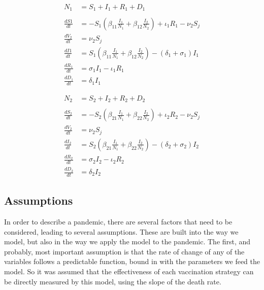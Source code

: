 \documentclass{article}
\begin{document}
\noindent\begin{minipage}{.5\linewidth}
\begin{align*}
    N_1 &= S_1 + I_1 + R_1 + D_1 \\ \\
    \frac{dS1}{dt} &= - S_1 \left(\beta_{11} \frac{I_1}{N_1} + \beta_{12} \frac{I_2}{N_2} \right) + \iota_1 R_1 - \nu_2S_j \\
    \frac{dV_2}{dt} &= \nu_2S_j\\
    \frac{dI1}{dt} &= S_1 \left(\beta_{11} \frac{I_1}{N_1} + \beta_{12} \frac{I_2}{N_2} \right) - (\delta_1 + \sigma_1) I_1\\
    \frac{dR_1}{dt} &= \sigma_1 I_1 - \iota_1 R_1\\
    \frac{dD_1}{dt} &= \delta_1 I_1 
\end{align*}
\end{minipage}%
\begin{minipage}{.5\linewidth}
\begin{align*}
  N_2 &= S_2 + I_2 + R_2 + D_2 \\ \\
  \frac{dS_2}{dt} &= - S_2 \left(\beta_{21} \frac{I_1}{N_1} + \beta_{22} \frac{I_2}{N_2} \right) + \iota_2 R_2 - \nu_2S_j \\
  \frac{dV_2}{dt} &= \nu_2S_j\\
  \frac{dI_2}{dt} &= S_2 \left(\beta_{21} \frac{I_1}{N_1} + \beta_{22} \frac{I_2}{N_2}\right) - (\delta_2 + \sigma_2) I_2\\
  \frac{dR_2}{dt} &= \sigma_2  I_2 - \iota_2 R_2\\
  \frac{dD_2}{dt} &= \delta_2 I_2
\end{align*}
\end{minipage}



\subsection{Assumptions}
In order to describe a pandemic, there are several factors that need to be considered, leading to several assumptions. These are built into the way we model, but also in the way we apply the model to the pandemic. The first, and probably, most important assumption is that the rate of change of any of the variables follows a predictable function, bound in with the parameters we feed the model. So it was  assumed that the effectiveness of each vaccination strategy can be directly measured by this model, using the slope of the death rate.\\
\end{document}
